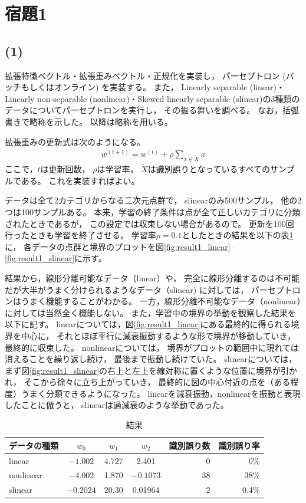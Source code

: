 \documentclass[class=jsarticle, crop=false, dvipdfmx, fleqn]{standalone}
\begin{document}
\section*{宿題1}

\subsection*{(1)}

拡張特徴ベクトル・拡張重みベクトル・正規化を実装し，
パーセプトロン (バッチもしくはオンライン) を実装する。
また，
Linearly separable (linear)・Linearly non-separable (nonlinear)・Skewed linearly separable (slinear)の3種類のデータについてパーセプトロンを実行し，
その振る舞いを調べる。
なお，括弧書きで略称を示した。
以降は略称を用いる。

拡張重みの更新式は次のようになる。
\begin{eqnarray}
    w^{(t+1)} = w^{(t)} + \rho \sum_{x \in \tilde{X}} x
\end{eqnarray}
ここで，\(t\)は更新回数，
\(\rho\)は学習率，
\(\tilde{X}\)は識別誤りとなっているすべてのサンプルである。
これを実装すればよい。

データは全て2カテゴリからなる二次元点群で，
slinearのみ500サンプル，
他の2つは100サンプルある。
本来，学習の終了条件は点が全て正しいカテゴリに分類されたときであるが，
この設定では収束しない場合があるので。
更新を100回行ったときも学習を終了させる。
学習率\(\rho = 0.1\)としたときの結果を以下の表\ref{tab:result1}に，
各データの点群と境界のプロットを図\ref{fig:result1_linear}--\ref{fig:result1_slinear}に示す。

結果から，線形分離可能なデータ（linear）や，
完全に線形分離するのは不可能だが大半がうまく分けられるようなデータ（slinear)
に対しては，
パーセプトロンはうまく機能することがわかる。
一方，線形分離不可能なデータ（nonlinear）に対しては当然全く機能しない。
また，学習中の境界の挙動を観察した結果を以下に記す。
linearについては，図\ref{fig:result1_linear}にある最終的に得られる境界を中心に，
それとほぼ平行に減衰振動するような形で境界が移動していき，
最終的に収束した。
nonlinearについては，
境界がプロットの範囲中に現れては消えることを繰り返し続け，
最後まで振動し続けていた。
slinearについては，
まず図\ref{fig:result1_slinear}の右上と左上を線対称に置くような位置に境界が引かれ，
そこから徐々に立ち上がっていき，
最終的に図の中心付近の点を（ある程度）うまく分類できるようになった。
linearを減衰振動，nonlinearを振動と表現したことに倣うと，
slinearは過減衰のような挙動であった。


\begin{table}
    \centering
    \caption{結果}
    \begin{tabular}{lcccrr}
        データの種類 & \(w_0\) & \(w_1\) & \(w_2\) & 識別誤り数 & 識別誤り率 \\ \hline
        linear & \(-1.002\) & 4.727 & 2.401 & 0 & 0{\%} \\
        nonlinear & \(-4.002\) & 1.870 & \(-0.1073\) & 38 & 38{\%} \\
        slinear & \(-0.2024\) & 20.30 & 0.01964 & 2 & 0.4{\%}
    \end{tabular}
    \label{tab:result1}
\end{table}
\end{document}
